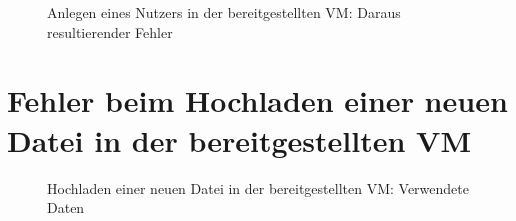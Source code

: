 \documentclass[12pt,DIV14,BCOR10mm,a4paper,parskip=half-,headsepline,headinclude,english,ngerman,bibliography=totocnumbered]{scrreprt}
\begin{document}
\begin{appendices}
\begin{figure}[!htb]
  \centering
    \label{createuser_fail_2}
    \caption{Anlegen eines Nutzers in der bereitgestellten VM: Daraus resultierender Fehler}
\end{figure}

\chapter{Fehler beim Hochladen einer neuen Datei in der bereitgestellten VM}

\begin{figure}[!htb]
  \centering
    \label{upload_fail_2}
    \caption{Hochladen einer neuen Datei in der bereitgestellten VM: Verwendete Daten}
  \end{figure}


\end{appendices}
\end{document}
